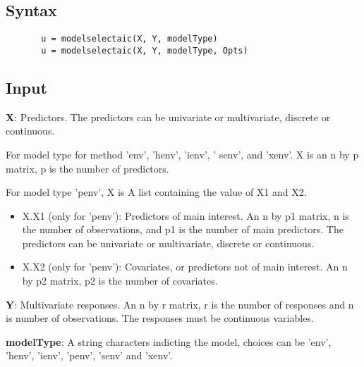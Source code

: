 \documentclass[a4paper,11pt,openany]{memoir}
\begin{document}
\subsection*{Syntax}


\begin{verbatim}       u = modelselectaic(X, Y, modelType)
       u = modelselectaic(X, Y, modelType, Opts)\end{verbatim}
    

\subsection*{Input}

\begin{par}
\textbf{X}: Predictors.   The predictors can be univariate or multivariate, discrete or continuous.
\end{par} \vspace{1em}
\begin{par}
For model type for method 'env', 'henv', 'ienv', ' senv', and 'xenv'. X is an n by p matrix, p is the number of predictors.
\end{par} \vspace{1em}
\begin{par}
For model type 'penv', X is  A list containing the value of X1 and X2.
\end{par} \vspace{1em}
\begin{itemize}
\setlength{\itemsep}{-1ex}
   \item X.X1 (only for 'penv'): Predictors of main interest. An n by p1 matrix, n is the number of observations, and p1 is the number of main predictors. The predictors can be univariate or multivariate, discrete or continuous.
   \item X.X2 (only for 'penv'): Covariates, or predictors not of main interest.  An n by p2 matrix, p2 is the number of covariates.
\end{itemize}
\begin{par}
\textbf{Y}: Multivariate responses. An n by r matrix, r is the number of responses and n is number of observations. The responses must be continuous variables.
\end{par} \vspace{1em}
\begin{par}
\textbf{modelType}: A string characters indicting the model, choices can be 'env', 'henv', 'ienv', 'penv', 'senv' and 'xenv'.
\end{par} \vspace{1em}
\end{document}
